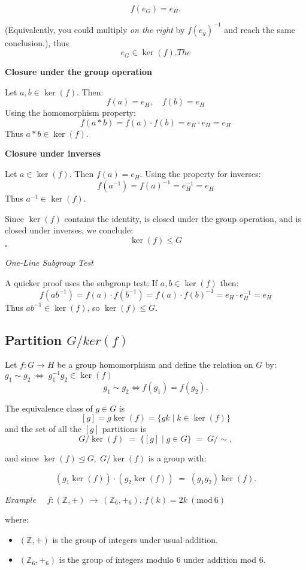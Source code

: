 \documentclass[12pt]{article}
\begin{document}
$$
f(e_G) = e_H.
$$

(Equivalently, you could multiply \textit{on the right} by $f(e_g)^{-1}$ and reach the same conclusion.), thus 
$$
e_G \in \ker(f)
. The$$


\textbf{Closure under the group operation}  

Let $a, b \in \ker(f)$. Then:
$$
f(a) = e_H, \quad f(b) = e_H
$$
Using the homomorphism property:
$$
f(a * b) = f(a) \cdot f(b) = e_H \cdot e_H = e_H
$$
Thus $a * b \in \ker(f)$.

\textbf{Closure under inverses}
  
Let $a \in \ker(f)$. Then $f(a) = e_H$.  
Using the property for inverses:
$$
f(a^{-1}) = f(a)^{-1} = e_H^{-1} = e_H
$$
Thus $a^{-1} \in \ker(f)$.

Since $\ker(f)$ contains the identity, is closed under the group operation, and is closed under inverses, we conclude:
$$
\ker(f) \leq G
$$
$\square$

\textit{One-Line Subgroup Test}

A quicker proof uses the subgroup test:  
If $a, b \in \ker(f)$ then:
$$
f(a b^{-1}) = f(a) \cdot f(b^{-1}) = f(a) \cdot f(b)^{-1} = e_H \cdot e_H^{-1} = e_H
$$
Thus $a b^{-1} \in \ker(f)$, so $\ker(f) \leq G$.

\subsection*{Partition $G /ker(f)$}


Let  $f : G \to H$ be a group homomorphism and define the relation on $G$ by: $g_1 \sim g_2 \; \Longleftrightarrow \; g_1^{-1} g_2 \in \ker(f)$
$$
g_1 \sim g_2 \iff f(g_1) = f(g_2).
$$

The equivalence class of $g \in G$ is $$[g] = g \ker(f) = \{ gk \mid k \in \ker(f) \}$$
and the set of all the $[g]$ partitions is
$$
G / \ker(f) \;=\; \{ [g] \mid g \in G \} \;=\; G / \!\sim,
$$

and since  $\ker(f) \trianglelefteq G, \; G / \ker(f)$  is a group with:

$$
(g_1 \ker(f)) \cdot (g_2 \ker(f)) \;=\; (g_1 g_2) \ker(f).
$$


\textit{Example} $\quad f : (\mathbb{Z}, +) \ \longrightarrow \ (\mathbb{Z}_6, +_6)$, 
$f(k) = 2k \ (\mathrm{mod}\ 6)$

where:
\begin{itemize}
	\item $(\mathbb{Z}, +)$ is the group of integers under usual addition.
	\item $(\mathbb{Z}_6, +_6)$ is the group of integers modulo $6$ under addition mod $6$.
\end{itemize}
\end{document}
